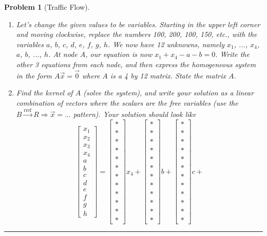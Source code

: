 \documentclass[letterpaper,oneside]{book}%
\theoremstyle{plain}
\theoremstyle{box}
\theoremstyle{problem}
\newtheorem{problemnum}{Problem}[chapter]
\newenvironment{problem}[1][]{\begin{problemnum}[#1]}{\end{problemnum}\nopagebreak\hrule\bigskip}
\newcommand{\bvec}[1]{\begin{bmatrix} #1 \end{bmatrix}}
\begin{document}
\begin{problem}[Traffic Flow]
\begin{enumerate}
 \item  
 Let's change the given values to be variables.  Starting in the upper left corner and moving clockwise, replace the numbers 100, 200, 100, 150, etc., with the variables $a$, $b$, $c$, $d$, $e$, $f$, $g$, $h$. We now have 12 unknowns, namely $x_1$, ..., $x_4$, $a$, $b$, ..., $h$. 
At node $A$, our equation is now $x_1+x_4-a-b=0$. Write the other 3 equations from each node, and then express the homogeneous system in the form $A\vec x = \vec 0$ where $A$ is a 4 by 12 matrix.  State the matrix $A$.
 \item Find the kernel of $A$ (solve the system), and write your solution as a linear combination of vectors where the scalars are the free variables (use the $B\xrightarrow{\text{rref}}R\Rightarrow\vec x = ...$ pattern). Your solution should look like 
$$
\bvec{x_1\\ x_2 \\ x_3\\ x_4\\a\\b\\c\\d\\e\\f\\g\\h}=
\bvec{*\\ *\\ *\\ *\\ *\\ *\\ *\\ *\\ *\\ *\\ *\\ *}x_4+
\bvec{*\\ *\\ *\\ *\\ *\\ *\\ *\\ *\\ *\\ *\\ *\\ *}b+
\bvec{*\\ *\\ *\\ *\\ *\\ *\\ *\\ *\\ *\\ *\\ *\\ *}c+
$$
\end{enumerate}
\end{problem}
\end{document}
